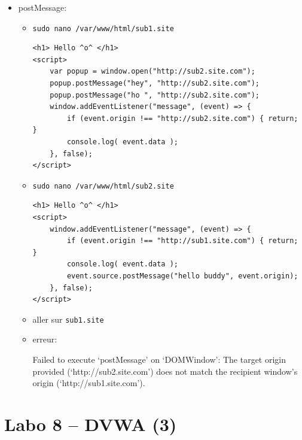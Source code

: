 \documentclass[a4paper]{article}
\begin{document}
\begin{itemize}
\item postMessage:
\begin{example} \begin{itemize}
    \item \texttt{sudo nano /var/www/html/sub1.site}
\begin{example} \begin{verbatim}
<h1> Hello ^o^ </h1>
<script>
    var popup = window.open("http://sub2.site.com");
    popup.postMessage("hey", "http://sub2.site.com");
    popup.postMessage("ho ", "http://sub2.site.com");
    window.addEventListener("message", (event) => {
        if (event.origin !== "http://sub2.site.com") { return; }
        console.log( event.data );
    }, false);
</script>
\end{verbatim} \end{example}
    \item \texttt{sudo nano /var/www/html/sub2.site}
\begin{example} \begin{verbatim}
<h1> Hello ^o^ </h1>
<script>
    window.addEventListener("message", (event) => {
        if (event.origin !== "http://sub1.site.com") { return; }
        console.log( event.data );
        event.source.postMessage("hello buddy", event.origin);
    }, false);
</script>
\end{verbatim} \end{example}
    \item aller sur \texttt{sub1.site}
    \item erreur:
    \begin{example}
        Failed to execute ‘postMessage’ on ‘DOMWindow’: The target origin provided (‘http://sub2.site.com’) does not match the recipient window’s origin (‘http://sub1.site.com’).
    \end{example}
\end{itemize} \end{example}


\end{itemize}















\section{Labo 8 -- DVWA (3)}
\end{document}
